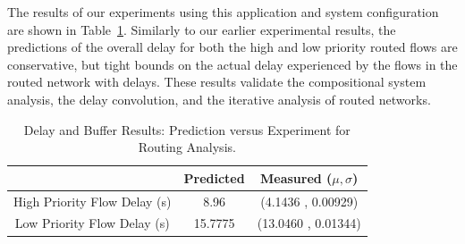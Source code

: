 The results of our experiments using this application and system
configuration are shown in Table~\ref{table:routing_results}.
Similarly to our earlier experimental results, the predictions of the
overall delay for both the high and low priority routed flows are
conservative, but tight bounds on the actual delay experienced by the
flows in the routed network with delays.  These results validate the
compositional system analysis, the delay convolution, and the
iterative analysis of routed networks.  

\begin{table}[htbp]
\caption{Delay and Buffer Results: Prediction versus Experiment for
  Routing Analysis.}
\begin{tabular}{| c | c | c |}
\hline
 & Predicted & Measured ($\mu,\sigma$) \\\hline
High Priority Flow Delay (s) & 8.96 & (4.1436 , 0.00929) \\\hline
Low Priority Flow Delay (s) & 15.7775 & (13.0460 , 0.01344) \\\hline
\end{tabular}
\label{table:routing_results}
\end{table}



\iffalse

\newpage

